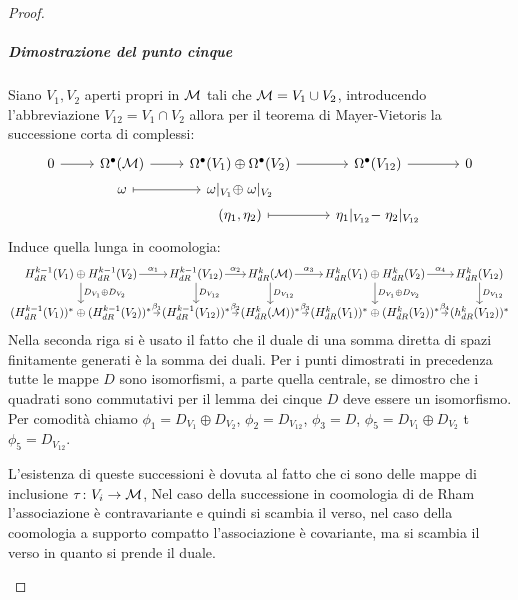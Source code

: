\begin{proof}
  \subparagraph{Dimostrazione del punto cinque} Siano $ V_1, V_2 $ aperti propri
  in $ \mathcal{M} $ tali che $ \mathcal{M} = V_1 \cup V_2 $, introducendo l'abbreviazione
  $ V_{12} = V_1 \cap V_2 $ allora per il teorema di Mayer-Vietoris la successione corta
  di complessi:
  \[
    \begin{tikzcd}[nodes = {row sep = 1 pt}]
      0 \rar & \Omega^\bullet(\M) \rar & \Omega^\bullet(V_1) \oplus \Omega^\bullet(V_2) \rar & \Omega^\bullet(V_{12}) \rar & 0 \\
      {} & \omega \rar[mapsto] & \omega\lvert_{V_1} \oplus\; \omega\lvert_{V_2} & {} & {} \\
      {} & {} & (\eta_1, \eta_2) \rar[mapsto] & \eta_1\lvert_{V_{12}} - \;\eta_2\lvert_{V_{12}} & {}
    \end{tikzcd}
  \]
  Induce quella lunga in coomologia:
  \[
    \begin{tikzcd}[nodes = {column sep = 6 pt, inner sep = 1.5pt}]
      H_{dR}^{k-1}(V_1) \oplus H_{dR}^{k-1}(V_2) \rar{\alpha_1} \dar{D_{V_1} \oplus D_{V_2}} & H^{k-1}_{dR}(V_{12}) \dar{D_{V_{12}}} \rar{\alpha_2} &
      H^k_{dR}(\M) \rar{\alpha_3} \dar{D_{V_{12}}} & H_{dR}^{k}(V_1) \oplus H_{dR}^{k}(V_2) \rar{\alpha_4}  \dar{D_{V_1} \oplus D_{V_2}} & H^k_{dR}(V_{12}) \dar{D_{V_{12}}}  \\
      (H_{dR}^{k-1}(V_1))^* \oplus (H_{dR}^{k-1}(V_2))^* \rar{\beta_1} &
      (H^{k-1}_{dR}(V_{12}))^* \rar{\beta_2} &(H^k_{dR}(\M))^* \rar{\beta_3} &
      (H_{dR}^{k}(V_1))^* \oplus (H_{dR}^{k}(V_2))^* \rar{\beta_4} & (h^k_{dR}(V_{12}))^*
    \end{tikzcd}
  \]
  Nella seconda riga si è usato il fatto che il duale di una somma diretta di spazi finitamente
  generati è la somma dei duali.
  Per i punti dimostrati in precedenza tutte le mappe $ D $ sono isomorfismi, a parte
  quella centrale, se dimostro che i quadrati sono commutativi per il lemma dei cinque
  $ D $ deve essere un isomorfismo. Per comodità chiamo $ \phi_1 = D_{V_1} \oplus D_{V_2} $,
  $ \phi_2 = D_{V_{12}} $, $ \phi_3 = D $, $ \phi_5 = D_{V_1} \oplus D_{V_2} $ t $ \phi_5 = D_{V_{12}} $.
  \begin{osservation}
    L'esistenza di queste successioni è dovuta al fatto che ci sono delle mappe
    di inclusione $ \tau \colon V_i \to \mathcal{M} $, Nel caso della successione in coomologia di
    de Rham l'associazione è contravariante e quindi si scambia il verso, nel caso
    della coomologia a supporto compatto l'associazione è covariante, ma si scambia il verso
    in quanto si prende il duale.
  \end{osservation}

\end{proof}

